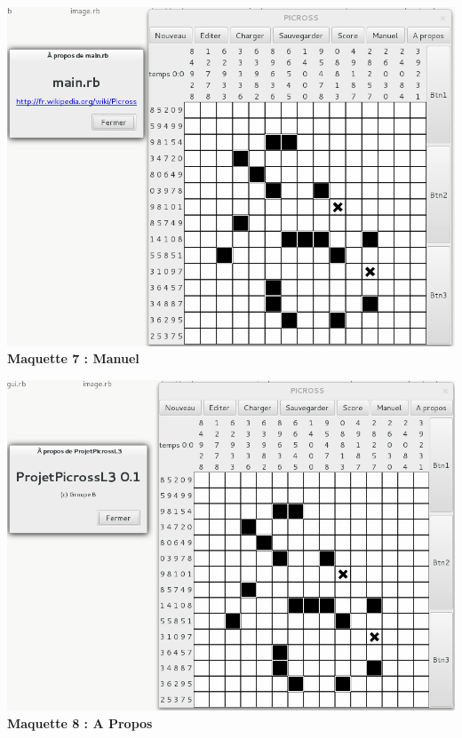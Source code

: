 \begin{center}
                \includegraphics[scale=0.6]{data/screenMaquette/Manuel.png}\\
                \textbf{Maquette 7 : Manuel}
\end{center}

\begin{center}
                \includegraphics[scale=0.6]{data/screenMaquette/APropos.png}\\
                \textbf{Maquette 8 : A Propos}
\end{center}



